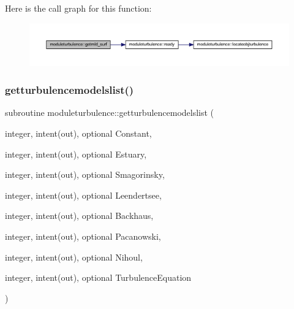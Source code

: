 Here is the call graph for this function\+:\nopagebreak
\begin{figure}[H]
\begin{center}
\leavevmode
\includegraphics[width=350pt]{namespacemoduleturbulence_a8e849950710589a5439a724899ac2b8d_cgraph}
\end{center}
\end{figure}
\mbox{\label{namespacemoduleturbulence_a7e2b5e220e823c62e0ceb84ca26e734b}} 
\subsubsection{\texorpdfstring{getturbulencemodelslist()}{getturbulencemodelslist()}}
{\footnotesize\ttfamily subroutine moduleturbulence\+::getturbulencemodelslist (\begin{DoxyParamCaption}\item[{integer, intent(out), optional}]{Constant,  }\item[{integer, intent(out), optional}]{Estuary,  }\item[{integer, intent(out), optional}]{Smagorinsky,  }\item[{integer, intent(out), optional}]{Leendertsee,  }\item[{integer, intent(out), optional}]{Backhaus,  }\item[{integer, intent(out), optional}]{Pacanowski,  }\item[{integer, intent(out), optional}]{Nihoul,  }\item[{integer, intent(out), optional}]{Turbulence\+Equation }\end{DoxyParamCaption})\hspace{0.3cm}{\ttfamily [private]}}

\mbox{\label{namespacemoduleturbulence_a6067ede135e4137914b0f3958ddc0353}} 
